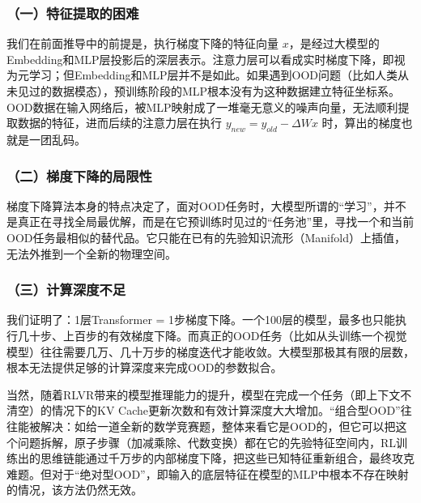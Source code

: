 \hypertarget{ux4e00ux7279ux5f81ux63d0ux53d6ux7684ux56f0ux96be}{%
\subsubsection{（一）特征提取的困难}\label{ux4e00ux7279ux5f81ux63d0ux53d6ux7684ux56f0ux96be}}

我们在前面推导中的前提是，执行梯度下降的特征向量 \(x\)，是经过大模型的Embedding和MLP层投影后的深层表示。注意力层可以看成实时梯度下降，即视为元学习；但Embedding和MLP层并不是如此。如果遇到OOD问题（比如人类从未见过的数据模态），预训练阶段的MLP根本没有为这种数据建立特征坐标系。OOD数据在输入网络后，被MLP映射成了一堆毫无意义的噪声向量，无法顺利提取数据的特征，进而后续的注意力层在执行 \(y_{new}=y_{old}-\Delta Wx\) 时，算出的梯度也就是一团乱码。

\hypertarget{ux4e8cux68afux5ea6ux4e0bux964dux7684ux5c40ux9650ux6027}{%
\subsubsection{（二）梯度下降的局限性}\label{ux4e8cux68afux5ea6ux4e0bux964dux7684ux5c40ux9650ux6027}}

梯度下降算法本身的特点决定了，面对OOD任务时，大模型所谓的``学习''，并不是真正在寻找全局最优解，而是在它预训练时见过的``任务池''里，寻找一个和当前OOD任务最相似的替代品。它只能在已有的先验知识流形（Manifold）上插值，无法外推到一个全新的物理空间。

\hypertarget{ux4e09ux8ba1ux7b97ux6df1ux5ea6ux4e0dux8db3}{%
\subsubsection{（三）计算深度不足}\label{ux4e09ux8ba1ux7b97ux6df1ux5ea6ux4e0dux8db3}}

我们证明了：1层Transformer = 1步梯度下降。一个100层的模型，最多也只能执行几十步、上百步的有效梯度下降。而真正的OOD任务（比如从头训练一个视觉模型）往往需要几万、几十万步的梯度迭代才能收敛。大模型那极其有限的层数，根本无法提供足够的计算深度来完成OOD的参数拟合。

当然，随着RLVR带来的模型推理能力的提升，模型在完成一个任务（即上下文不清空）的情况下的KV Cache更新次数和有效计算深度大大增加。``组合型OOD''往往能被解决：如给一道全新的数学竞赛题，整体来看它是OOD的，但它可以把这个问题拆解，原子步骤（加减乘除、代数变换）都在它的先验特征空间内，RL训练出的思维链能通过千万步的内部梯度下降，把这些已知特征重新组合，最终攻克难题。但对于``绝对型OOD''，即输入的底层特征在模型的MLP中根本不存在映射的情况，该方法仍然无效。

